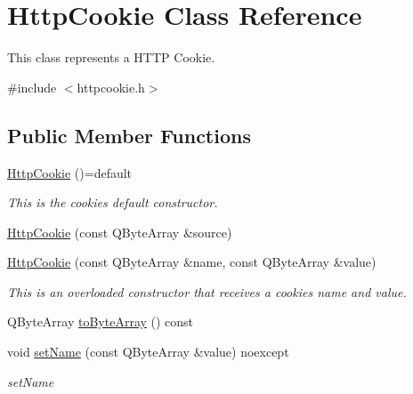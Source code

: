 \hypertarget{class_http_cookie}{}\section{Http\+Cookie Class Reference}
\label{class_http_cookie}


This class represents a H\+T\+TP Cookie.  




{\ttfamily \#include $<$httpcookie.\+h$>$}

\subsection*{Public Member Functions}
\begin{DoxyCompactItemize}
\item 
\mbox{\label{class_http_cookie_a728bef99b74d352b1762cc98e67cc93c}} 
\hyperlink{class_http_cookie_a728bef99b74d352b1762cc98e67cc93c}{Http\+Cookie} ()=default
\begin{DoxyCompactList}\small\item\em This is the cookie\textquotesingle{}s default constructor. \end{DoxyCompactList}\item 
\hyperlink{class_http_cookie_aeb0f2cb5f7e8ef2fc7503663e29941c4}{Http\+Cookie} (const Q\+Byte\+Array \&source)
\item 
\hyperlink{class_http_cookie_a2037d1e3f9a6f65f0f3575df1cfcc200}{Http\+Cookie} (const Q\+Byte\+Array \&name, const Q\+Byte\+Array \&value)
\begin{DoxyCompactList}\small\item\em This is an overloaded constructor that receives a cookie\textquotesingle{}s name and value. \end{DoxyCompactList}\item 
Q\+Byte\+Array \hyperlink{class_http_cookie_aef937847dbebf7290e94b94afbb8f9a1}{to\+Byte\+Array} () const
\item 
\mbox{\label{class_http_cookie_abf6c25aa3654581007514fb8eb05ce7e}} 
void \hyperlink{class_http_cookie_abf6c25aa3654581007514fb8eb05ce7e}{set\+Name} (const Q\+Byte\+Array \&value) noexcept
\begin{DoxyCompactList}\small\item\em set\+Name \end{DoxyCompactList}\item 

\end{DoxyCompactItemize}
